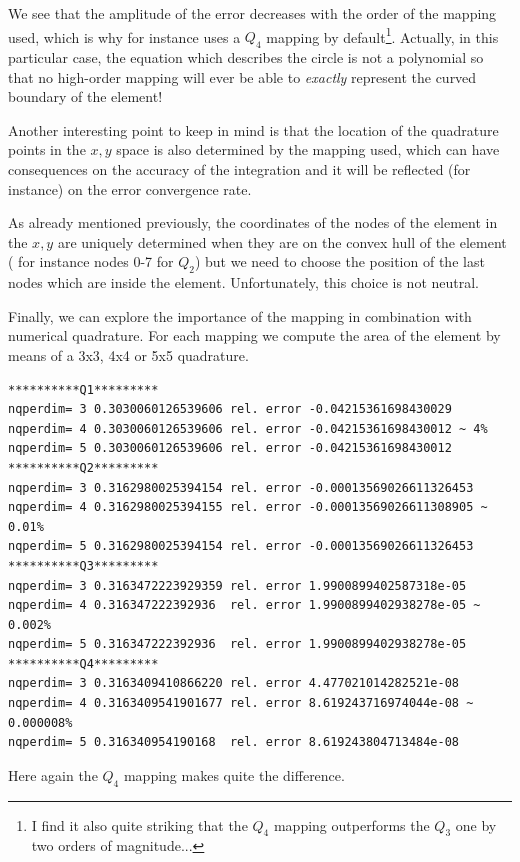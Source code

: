 We see that the amplitude of the error decreases with the order of the mapping used, 
which is why for instance \aspect uses a $Q_4$ mapping by default\footnote{I find it also quite striking 
that the $Q_4$ mapping outperforms the $Q_3$ one by two orders of magnitude...}.
Actually, in this particular case, the equation which describes the circle is not a 
polynomial so that no high-order mapping will ever be able to {\it exactly} 
represent the curved boundary of the element!

Another interesting point to keep in mind is that the location of the quadrature points
in the $x,y$ space is also determined by the mapping used, which can have consequences
on the accuracy of the integration and it will be reflected (for instance) on the 
error convergence rate.

As already mentioned previously, 
the coordinates of the nodes of the element in the $x,y$ are 
uniquely determined when they are on the convex hull of the element (
for instance nodes 0-7 for $Q_2$) but we need to choose the position 
of the last nodes which are inside the element. Unfortunately, this choice is 
not neutral. 

Finally, we can explore the importance of the mapping in combination with 
numerical quadrature. For each mapping we compute the area of the element
by means of a 3x3, 4x4 or 5x5 quadrature.

\begin{verbatim}
**********Q1*********
nqperdim= 3 0.3030060126539606 rel. error -0.04215361698430029
nqperdim= 4 0.3030060126539606 rel. error -0.04215361698430012 ~ 4%
nqperdim= 5 0.3030060126539606 rel. error -0.04215361698430012
**********Q2*********
nqperdim= 3 0.3162980025394154 rel. error -0.00013569026611326453
nqperdim= 4 0.3162980025394155 rel. error -0.00013569026611308905 ~ 0.01%
nqperdim= 5 0.3162980025394154 rel. error -0.00013569026611326453
**********Q3*********
nqperdim= 3 0.3163472223929359 rel. error 1.9900899402587318e-05
nqperdim= 4 0.316347222392936  rel. error 1.9900899402938278e-05 ~ 0.002%
nqperdim= 5 0.316347222392936  rel. error 1.9900899402938278e-05
**********Q4*********
nqperdim= 3 0.3163409410866220 rel. error 4.477021014282521e-08
nqperdim= 4 0.3163409541901677 rel. error 8.619243716974044e-08 ~ 0.000008%
nqperdim= 5 0.316340954190168  rel. error 8.619243804713484e-08
\end{verbatim}

Here again the $Q_4$ mapping makes quite the difference. 

\newpage

